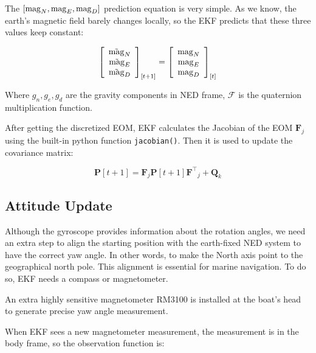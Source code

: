 The $[{\rm mag}_N, {\rm mag}_E, {\rm mag}_D]$ prediction equation is very simple. As we know, the earth's magnetic field barely changes locally, so the EKF predicts that these three values keep constant:

\begin{equation}
    \left[\begin{array}{c}
            \Tilde{\rm mag}_N  \\
            \Tilde{\rm mag}_E  \\
            \Tilde{\rm mag}_D
        \end{array}\right]_{[t+1]}=\left[\begin{array}{c}
            {\rm mag}_N  \\
            {\rm mag}_E  \\
            {\rm mag}_D
        \end{array}\right]_{[t]}
\end{equation}


Where $g_n,g_e,g_d$ are the gravity components in NED frame, $\mathcal{F}$ is the quaternion multiplication function.


After getting the discretized EOM, EKF calculates the Jacobian of the EOM $\boldsymbol{F}_j$ using the built-in python function \texttt{jacobian()}. Then it is used to update the covariance matrix:

\begin{equation}
    \boldsymbol{P}[t+1]=\boldsymbol{F}_j \boldsymbol{P}[t+1] {\boldsymbol{F}^\top}_j+\boldsymbol{Q}_k
\end{equation}

\subsection{Attitude Update}

Although the gyroscope provides information about the rotation angles, we need an extra step to align the starting position with the earth-fixed NED system to have the correct yaw angle. In other words, to make the North axis point to the geographical north pole. This alignment is essential for marine navigation. To do so, EKF needs a compass or magnetometer.

An extra highly sensitive magnetometer RM3100 is installed at the boat's head to generate precise yaw angle measurement.  

When EKF sees a new magnetometer measurement, the measurement is  in the body frame, so the observation function is:

